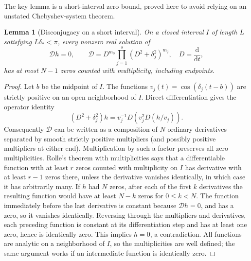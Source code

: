 \documentclass[11pt]{article}
\newtheorem{lemma}[theorem]{Lemma}
\theoremstyle{remark}\newtheorem{remark}[theorem]{Remark}
\begin{document}
The key lemma is a short-interval zero bound, proved here to avoid relying on an unstated Chebyshev-system theorem.
\begin{lemma}[Disconjugacy on a short interval]\label{lem:dis}
On a closed interval $I$ of length $L$ satisfying $L\delta_*<\pi$, every nonzero real solution of
\[
 \mathcal D h=0,\qquad \mathcal D=D^{m_0}\prod_{j=1}^s(D^2+\delta_j^2)^{m_j},\quad D=\frac{\mathrm d}{\mathrm dt},
\]
has at most $N-1$ zeros counted with multiplicity, including endpoints.
\end{lemma}
\begin{proof}
Let $b$ be the midpoint of $I$. The functions $v_j(t)=\cos(\delta_j(t-b))$ are strictly positive on an open neighborhood of $I$. Direct differentiation gives the operator identity
\[
 (D^2+\delta_j^2)h=v_j^{-1}D\left(v_j^2D(h/v_j)\right).
\]
Consequently $\mathcal D$ can be written as a composition of $N$ ordinary derivatives separated by smooth strictly positive multipliers (and possibly positive multipliers at either end). Multiplication by such a factor preserves all zero multiplicities. Rolle's theorem with multiplicities says that a differentiable function with at least $r$ zeros counted with multiplicity on $I$ has derivative with at least $r-1$ zeros there, unless the derivative vanishes identically, in which case it has arbitrarily many. If $h$ had $N$ zeros, after each of the first $k$ derivatives the resulting function would have at least $N-k$ zeros for $0\le k<N$. The function immediately before the last derivative is constant because $\mathcal D h=0$, and has a zero, so it vanishes identically. Reversing through the multipliers and derivatives, each preceding function is constant at its differentiation step and has at least one zero, hence is identically zero. This implies $h=0$, a contradiction. All functions are analytic on a neighborhood of $I$, so the multiplicities are well defined; the same argument works if an intermediate function is identically zero.
\end{proof}
\end{document}
